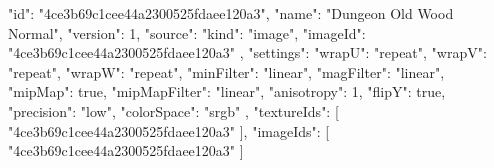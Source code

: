 {
  "id": "4ce3b69c1cee44a2300525fdaee120a3",
  "name": "Dungeon Old Wood Normal",
  "version": 1,
  "source": {
    "kind": "image",
    "imageId": "4ce3b69c1cee44a2300525fdaee120a3"
  },
  "settings": {
    "wrapU": "repeat",
    "wrapV": "repeat",
    "wrapW": "repeat",
    "minFilter": "linear",
    "magFilter": "linear",
    "mipMap": true,
    "mipMapFilter": "linear",
    "anisotropy": 1,
    "flipY": true,
    "precision": "low",
    "colorSpace": "srgb"
  },
  "textureIds": [
    "4ce3b69c1cee44a2300525fdaee120a3"
  ],
  "imageIds": [
    "4ce3b69c1cee44a2300525fdaee120a3"
  ]
}
